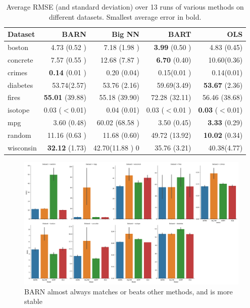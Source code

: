 \documentclass[12pt]{article}
\begin{document}
\begin{table}[htb]
\centering
\caption{Average RMSE (and standard deviation) over 13 runs of various methods on different datasets.  Smallest average error in bold.}
\begin{tabular}{lrrrr}
Dataset   &     BARN &    Big NN &      BART & OLS\\ \hline
boston    &  4.73 (0.52 )  &  7.18 (1.98 )  &  \textbf{3.99} (0.50 )  &  4.83 (0.45) \\
concrete   & 7.57 (0.55 )  & 12.68 (7.87 )  &  \textbf{6.70} (0.40)  & 10.60(0.36) \\
crimes     & \textbf{0.14 } (0.01 )  & 0.20 (0.04)  &  0.15(0.01 )  & 0.14(0.01) \\
diabetes  & 53.74(2.57)  & 53.76 (2.16)&  59.69(3.49)  & \textbf{53.67} (2.36) \\
fires     & \textbf{55.01} (39.88)  & 55.18 (39.90) &  72.28 (32.11)  & 56.46 (38.68) \\
    isotope    & 0.03  ($<$0.01)  & 0.04 (0.01)  &  0.03 ($<$0.01 )  & \textbf{0.03} ($<$0.01) \\
mpg        & 3.60 (0.48)  & 60.02 (68.58 )  &  3.50  (0.45)  & \textbf{3.33} (0.29) \\
random    & 11.16 (0.63 )  & 11.68 (0.60) &  49.72 (13.92)  & \textbf{10.02} (0.34) \\
wisconsin & \textbf{32.12} (1.73)  & 42.70(11.88 ) 0&  35.76 (3.21)  & 40.38(4.77) \\
\end{tabular}
    \label{tab:results}
\end{table}

\begin{figure}[ht]
\centering
    \includegraphics[scale=.3]{figs/pres_results.png}
    \caption{BARN almost always matches or beats other methods, and is more stable}
    \label{fig:results}
\end{figure}
\end{document}
